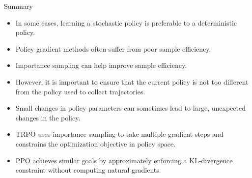 \begin{frame}{Summary}
\begin{itemize}
    \item In some cases, learning a stochastic policy is preferable to a deterministic policy.
    \item Policy gradient methods often suffer from poor sample efficiency.
    \item Importance sampling can help improve sample efficiency.
    \item However, it is important to ensure that the current policy is not too different from the policy used to collect trajectories.
    \item Small changes in policy parameters can sometimes lead to large, unexpected changes in the policy.
    \item TRPO uses importance sampling to take multiple gradient steps and constrains the optimization objective in policy space.
    \item PPO achieves similar goals by approximately enforcing a KL-divergence constraint without computing natural gradients.
\end{itemize}
\end{frame}
